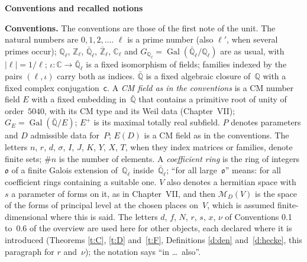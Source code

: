 \documentclass[11pt,a4paper]{article}
\newcommand{\Gal}{\operatorname{Gal}}
\newcommand{\m}[1]{\mbox{$#1$}}        %
\newcommand{\sect}[2]{\refstepcounter{section}\label{#2}\par\addvspace{19pt plus 4pt minus 2pt}\Needspace{7\baselineskip}%
  \noindent\llap{{\fontsize{13.2}{16}\selectfont\bfseries\color{inkfaint}\thesection}\hspace{9pt}}%
  {\fontsize{13.2}{16}\selectfont\bfseries\color{ink}#1}\par\nopagebreak\vspace{-1pt}}
\theoremstyle{plainx}
\theoremstyle{uprightx}
\newenvironment{conventions}{\par\addvspace{5pt}\noindent\textbf{Conventions.}\enspace\ignorespaces}{\par\addvspace{3pt}}
\newcommand{\CC}{\mathbb{C}}
\newcommand{\Qb}{\bar{\mathbb{Q}}}
\newcommand{\Ql}{\mathbb{Q}_\ell}
\newcommand{\Zl}{\mathbb{Z}_\ell}
\newcommand{\Qlb}{\bar{\mathbb{Q}}_\ell}
\newcommand{\Zlb}{\bar{\mathbb{Z}}_\ell}
\newcommand{\Cl}{\mathbb{C}_\ell}
\newcommand{\Gl}{G_{\mathbb{Q}_\ell}}
\newcommand{\GE}[1]{G_{#1}}
\newcommand{\fo}{\mathfrak{o}}
\newcommand{\ED}[1]{E(#1)}
\begin{document}
\sect{Conventions and recalled notions}{s:back}
\begin{conventions}\label{c:conventions}
The conventions are those of the first note of the unit. The natural numbers are \m{0,1,2,\dots}. $\ell$ is a
prime number (also $\ell'$, when several primes occur); \m{\Ql}, \m{\Zl}, \m{\Qlb}, \m{\Zlb}, \m{\Cl} and
\m{\Gl=\Gal(\Qlb/\Ql)} are as usual, with \m{|\ell|=1/\ell}; \m{\iota\colon\CC\to\Qlb} is a fixed isomorphism of fields;
families indexed by the pairs \m{(\ell,\iota)} carry both as indices. \m{\Qb} is a fixed algebraic closure
of~$\mathbb{Q}$ with a fixed complex conjugation~$\mathsf{c}$. A \emph{CM field as in the conventions} is a CM
number field $E$ with a fixed embedding in~\m{\Qb} that contains a primitive root of unity of order~$5040$, with
its CM type and its Weil data (Chapter~VII); \m{\GE{E}=\Gal(\Qb/E)}; $E^{+}$ is its maximal totally real subfield.
$P$ denotes parameters and $D$ admissible data for~$P$; \m{\ED{D}} is a CM field as in the conventions. The
letters $n$, $r$, $d$, $\sigma$, $I$, $J$, $K$, $Y$, $X$, $T$, when they index matrices or families, denote finite sets;
\m{\#n} is the number of elements. A \emph{coefficient ring} is the ring of integers $\fo$ of a finite Galois
extension of~\m{\Ql} inside~\m{\Qlb}; ``for all large~$\fo$'' means: for all coefficient rings containing a
suitable one. $V$ also denotes a hermitian space with $s$ a parameter of forms on it, as in Chapter~VII, and
then \m{\mathcal{M}_D(V)} is the space of the forms of principal level at the chosen places on~$V$, which is
assumed finite-dimensional where this is said.
The letters $d$, $f$, $N$, $r$, $s$, $x$, $\nu$ of Conventions 0.1 to~0.6 of the overview are used here for other objects, each
declared where it is introduced (Theorems \ref{t:C}, \ref{t:D} and~\ref{t:F}, Definitions \ref{d:den} and~\ref{d:hecke}, this
paragraph for $r$ and~$\nu$); the notation says ``in \dots\ also''.
\end{conventions}
\end{document}
